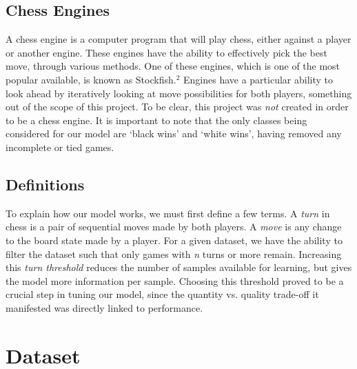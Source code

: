 \documentclass[]{interact}
\theoremstyle{plain}%
\theoremstyle{definition}
\theoremstyle{remark}
\begin{document}
\subsection{Chess Engines}
A chess engine is a computer program that will play chess, either against a player or another engine. These engines have the ability to effectively pick the best move, through various methods. One of these engines, which is one of the most popular available, is known as Stockfish.$^2$ Engines have a particular ability to look ahead by iteratively looking at move possibilities for both players, something out of the scope of this project. To be clear, this project was \textit{not} created in order to be a chess engine. It is important to note that the only classes being considered for our model are ‘black wins’ and ‘white wins’, having removed any incomplete or tied games.

\subsection{Definitions}
To explain how our model works, we must first define a few terms. A \textit{turn} in chess is a pair of sequential moves made by both players. A \textit{move} is any change to the board state made by a player. For a given dataset, we have the ability to filter the dataset such that only games with \textit{n} turns or more remain. Increasing this \textit{turn threshold} reduces the number of samples available for learning, but gives the model more information per sample. Choosing this threshold proved to be a crucial step in tuning our model, since the quantity vs. quality trade-off it manifested was directly linked to performance.

\section{Dataset}
\end{document}
